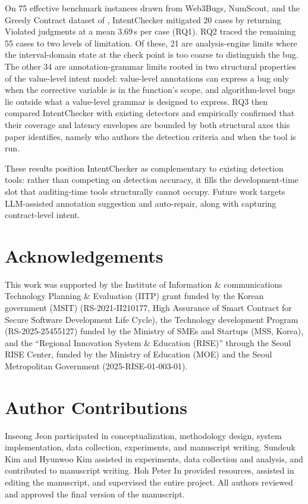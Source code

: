 \documentclass[pdflatex,sn-basic]{sn-jnl}%
\theoremstyle{thmstyleone}%
\theoremstyle{thmstyletwo}%
\theoremstyle{thmstylethree}%
\begin{document}
On 75 effective benchmark instances drawn from Web3Bugs, NumScout, and the Greedy Contract dataset of \citet{flyinointment}, IntentChecker mitigated 20 cases by returning Violated judgments at a mean 3.69\,s per case (RQ1). RQ2 traced the remaining 55 cases to two levels of limitation. Of these, 21 are analysis-engine limits where the interval-domain state at the check point is too coarse to distinguish the bug. The other 34 are annotation-grammar limits rooted in two structural properties of the value-level intent model: value-level annotations can express a bug only when the corrective variable is in the function's scope, and algorithm-level bugs lie outside what a value-level grammar is designed to express. RQ3 then compared IntentChecker with existing detectors and empirically confirmed that their coverage and latency envelopes are bounded by both structural axes this paper identifies, namely who authors the detection criteria and when the tool is run.

These results position IntentChecker as complementary to existing detection tools: rather than competing on detection accuracy, it fills the development-time slot that auditing-time tools structurally cannot occupy. Future work targets LLM-assisted annotation suggestion and auto-repair, along with capturing contract-level intent.

\section*{Acknowledgements}
This work was supported by the Institute of Information \& communications Technology Planning \& Evaluation (IITP) grant funded by the Korean government (MSIT) (RS-2021-II210177, High Assurance of Smart Contract for Secure Software Development Life Cycle), the Technology development Program (RS-2025-25455127) funded by the Ministry of SMEs and Startups (MSS, Korea), and the ``Regional Innovation System \& Education (RISE)'' through the Seoul RISE Center, funded by the Ministry of Education (MOE) and the Seoul Metropolitan Government (2025-RISE-01-003-01).

\section*{Author Contributions}
Inseong Jeon participated in conceptualization, methodology design, system implementation, data collection, experiments, and manuscript writing. Sundeuk Kim and Hyunwoo Kim assisted in experiments, data collection and analysis, and contributed to manuscript writing. Hoh Peter In provided resources, assisted in editing the manuscript, and supervised the entire project. All authors reviewed and approved the final version of the manuscript.
\end{document}
